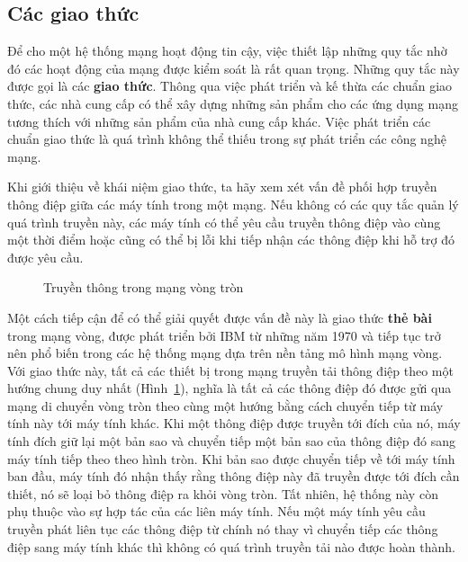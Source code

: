 \subsection*{Các giao thức}
Để cho một hệ thống mạng hoạt động tin cậy, việc thiết lập những quy tắc nhờ
đó các hoạt động của mạng được kiểm soát là rất quan trọng. Những quy tắc này được gọi là
các \textbf{giao thức}. Thông qua việc phát triển và kế thừa các chuẩn giao thức, các nhà
cung cấp có thể xây dựng những sản phẩm cho các ứng dụng mạng tương thích với những sản
phẩm của nhà cung cấp khác. Việc phát triển các chuẩn giao thức là quá trình không
thể thiếu trong sự phát triển các công nghệ mạng.


Khi giới thiệu về khái niệm giao thức, ta hãy xem xét vấn đề  phối hợp truyền thông điệp giữa các máy tính trong một mạng. Nếu không có các quy tắc  quản lý quá
trình truyền  này, các máy tính có thể yêu cầu truyền thông điệp vào cùng một
thời điểm hoặc cũng có thể bị lỗi khi tiếp nhận các thông điệp khi hỗ trợ đó được yêu cầu.


\begin{figure}[tbh] 
\centering
    \caption{Truyền thông trong mạng vòng tròn}
  \label{fig:fig4.2}
\end{figure}

Một cách tiếp cận để có thể giải quyết được vấn đề này là giao thức \textbf{thẻ bài} trong
mạng vòng, được phát triển bởi IBM từ  những năm 1970 và tiếp tục trở nên phổ biến
trong các hệ thống mạng dựa trên nền tảng mô hình mạng vòng. Với giao thức này, tất
cả các thiết bị trong mạng truyền tải thông điệp theo một hướng chung duy nhất
(Hình~\ref{fig:fig4.2}), nghĩa là tất cả các thông điệp đó được gửi qua mạng di chuyển
vòng tròn theo cùng một hướng bằng cách chuyển tiếp từ máy tính này tới máy tính khác. Khi
một thông điệp được truyền tới đích của nó, máy tính đích giữ lại một bản sao và chuyển
tiếp một bản sao của thông điệp đó sang máy tính tiếp theo theo hình tròn. Khi bản sao
được chuyển tiếp về tới máy tính ban đầu, máy tính đó nhận thấy rằng thông điệp này đã
truyền được tới đích cần thiết, nó sẽ loại bỏ thông điệp ra khỏi vòng tròn. Tất nhiên, hệ
thống này còn phụ thuộc vào sự hợp tác của các liên máy tính. Nếu một máy tính yêu cầu
truyền phát liên tục các thông điệp từ chính nó thay vì chuyển tiếp các thông điệp sang
máy tính khác thì không có quá trình truyền tải nào được hoàn thành.


